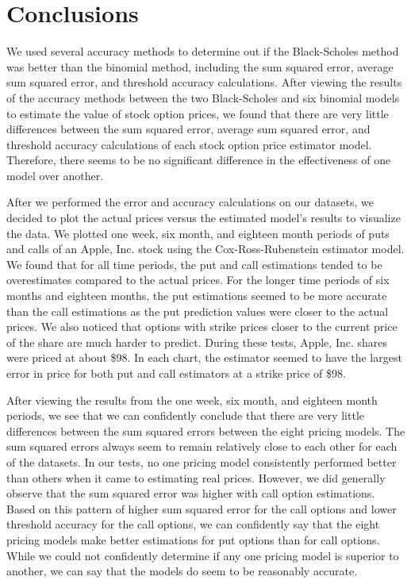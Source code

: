 \chapter{Conclusions}

We used several accuracy methods to determine out if the Black-Scholes method was better than the binomial method, including the sum squared error, average sum squared error, and threshold accuracy calculations. After viewing the results of the accuracy methods between the two Black-Scholes and six binomial models to estimate the value of stock option prices, we found that there are very little differences between the sum squared error, average sum squared error, and  threshold accuracy calculations of each stock option price estimator model. Therefore, there seems to be no significant difference in the effectiveness of one model over another.  

After we performed the error and accuracy calculations on our datasets, we decided to plot the actual prices versus the estimated model's results to visualize the data. We plotted one week, six month, and eighteen month periods of puts and calls of an Apple, Inc. stock using the Cox-Ross-Rubenstein estimator model. We found that for all time periods, the put and call estimations tended to be overestimates compared to the actual prices. For the longer time periods of six months and eighteen months, the put estimations seemed to be more accurate than the call estimations as the put prediction values were closer to the actual prices. We also noticed that options with strike prices closer to the current price of the share are much harder to predict. During these tests, Apple, Inc. shares were priced at about \$98. In each chart, the estimator seemed to have the largest error in price for both put and call estimators at a strike price of \$98.

After viewing the results from the one week, six month, and eighteen month periods, we see that we can confidently conclude that there are very little differences between the sum squared errors between the eight pricing models. The sum squared errors always seem to remain relatively close to each other for each of the datasets. In our tests, no one pricing model consistently performed better than others when it came to estimating real prices. However, we did generally observe that the sum squared error was higher with call option estimations. Based on this pattern of higher sum squared error for the call options and lower threshold accuracy for the call options, we can confidently say that the eight pricing models make better estimations for put options than for call options. While we could not confidently determine if any one pricing model is superior to another, we can say that the models do seem to be reasonably accurate.
